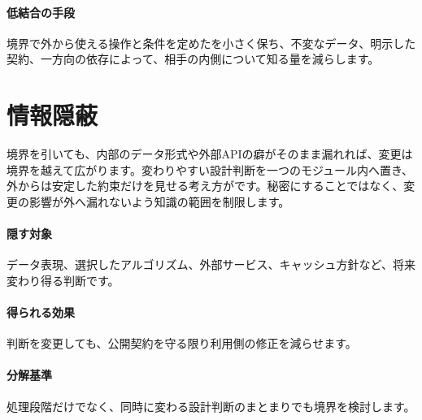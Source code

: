 \paragraph{低結合の手段}
        境界で外から使える操作と条件を定めたを小さく保ち、不変なデータ、明示した契約、一方向の依存によって、相手の内側について知る量を減らします。

\par
\endgroup
\par
\endgroup


\section{情報隠蔽}
\label{sec:04-software-engineering-05}

境界を引いても、内部のデータ形式や外部APIの癖がそのまま漏れれば、変更は境界を越えて広がります。変わりやすい設計判断を一つのモジュール内へ置き、外からは安定した約束だけを見せる考え方がです。秘密にすることではなく、変更の影響が外へ漏れないよう知識の範囲を制限します。

\begingroup
  \centering
  \vspace{3mm}
\begingroup
\paragraph{隠す対象}
        データ表現、選択したアルゴリズム、外部サービス、キャッシュ方針など、将来変わり得る判断です。

\par
\endgroup
\medskip
\begingroup
\paragraph{得られる効果}
        判断を変更しても、公開契約を守る限り利用側の修正を減らせます。

\par
\endgroup
\medskip
\begingroup
\paragraph{分解基準}
        処理段階だけでなく、同時に変わる設計判断のまとまりでも境界を検討します。

\par
\endgroup
\par
\endgroup


